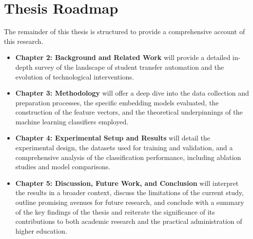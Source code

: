 \section{Thesis Roadmap}
The remainder of this thesis is structured to provide a comprehensive account of this research.
\begin{itemize}
    \item \textbf{Chapter 2: Background and Related Work} will provide a detailed in-depth survey of the landscape of student transfer automation and the evolution of technological interventions.
    \item \textbf{Chapter 3: Methodology} will offer a deep dive into the data collection and preparation processes, the specific embedding models evaluated, the construction of the feature vectors, and the theoretical underpinnings of the machine learning classifiers employed.
    \item \textbf{Chapter 4: Experimental Setup and Results} will detail the experimental design, the datasets used for training and validation, and a comprehensive analysis of the classification performance, including ablation studies and model comparisons.
    \item \textbf{Chapter 5: Discussion, Future Work, and Conclusion} will interpret the results in a broader context, discuss the limitations of the current study, outline promising avenues for future research, and conclude with a summary of the key findings of the thesis and reiterate the significance of its contributions to both academic research and the practical administration of higher education.
\end{itemize}

